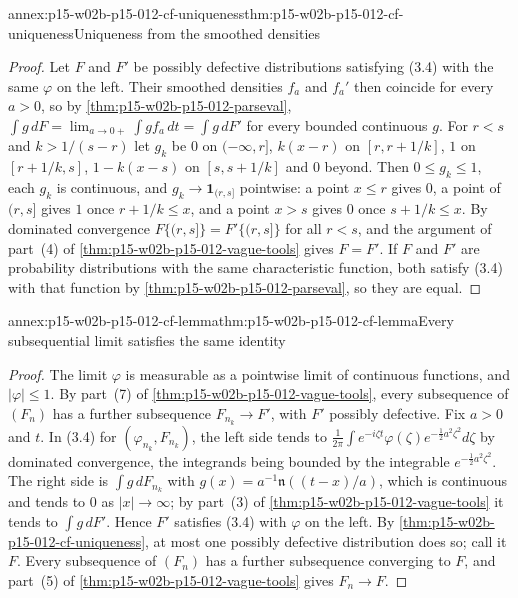 \begin{annexitem}{annex:p15-w02b-p15-012-cf-uniqueness}{thm:p15-w02b-p15-012-cf-uniqueness}{Uniqueness from the smoothed densities}
\begin{proof}
Let \(F\) and \(F'\) be possibly defective distributions satisfying (3.4) with
the same \(\varphi\) on the left. Their smoothed densities \(f_a\) and \(f_a'\)
then coincide for every \(a>0\), so by \cref{thm:p15-w02b-p15-012-parseval},
\(\int g\,dF=\lim_{a\to0+}\int gf_a\,dt=\int g\,dF'\) for every bounded
continuous \(g\). For \(r<s\) and \(k>1/(s-r)\) let \(g_k\) be \(0\) on
\((-\infty,r]\), \(k(x-r)\) on \([r,r+1/k]\), \(1\) on \([r+1/k,s]\),
\(1-k(x-s)\) on \([s,s+1/k]\) and \(0\) beyond. Then \(0\leq g_k\leq1\), each
\(g_k\) is continuous, and \(g_k\to\mathbf 1_{(r,s]}\) pointwise: a point
\(x\leq r\) gives \(0\), a point of \((r,s]\) gives \(1\) once
\(r+1/k\leq x\), and a point \(x>s\) gives \(0\) once \(s+1/k\leq x\). By
dominated convergence \(F\{(r,s]\}=F'\{(r,s]\}\) for all \(r<s\), and the
argument of part~(4) of \cref{thm:p15-w02b-p15-012-vague-tools} gives
\(F=F'\). If \(F\) and \(F'\) are probability distributions with the same
characteristic function, both satisfy (3.4) with that function by
\cref{thm:p15-w02b-p15-012-parseval}, so they are equal.
\end{proof}
\end{annexitem}

\begin{annexitem}{annex:p15-w02b-p15-012-cf-lemma}{thm:p15-w02b-p15-012-cf-lemma}{Every subsequential limit satisfies the same identity}
\begin{proof}
The limit \(\varphi\) is measurable as a pointwise limit of continuous
functions, and \(|\varphi|\leq1\). By part~(7) of
\cref{thm:p15-w02b-p15-012-vague-tools}, every subsequence of \((F_n)\) has a
further subsequence \(F_{n_k}\to F'\), with \(F'\) possibly defective. Fix
\(a>0\) and \(t\). In (3.4) for \((\varphi_{n_k},F_{n_k})\), the left side
tends to \(\frac1{2\pi}\int e^{-i\zeta t}\varphi(\zeta)e^{-\frac12a^2\zeta^2}d\zeta\)
by dominated convergence, the integrands being bounded by the integrable
\(e^{-\frac12a^2\zeta^2}\). The right side is \(\int g\,dF_{n_k}\) with
\(g(x)=a^{-1}\mathfrak n((t-x)/a)\), which is continuous and tends to \(0\) as
\(|x|\to\infty\); by part~(3) of \cref{thm:p15-w02b-p15-012-vague-tools} it
tends to \(\int g\,dF'\). Hence \(F'\) satisfies (3.4) with \(\varphi\) on the
left. By \cref{thm:p15-w02b-p15-012-cf-uniqueness}, at most one possibly
defective distribution does so; call it \(F\). Every subsequence of \((F_n)\)
has a further subsequence converging to \(F\), and part~(5) of
\cref{thm:p15-w02b-p15-012-vague-tools} gives \(F_n\to F\).
\end{proof}
\end{annexitem}

